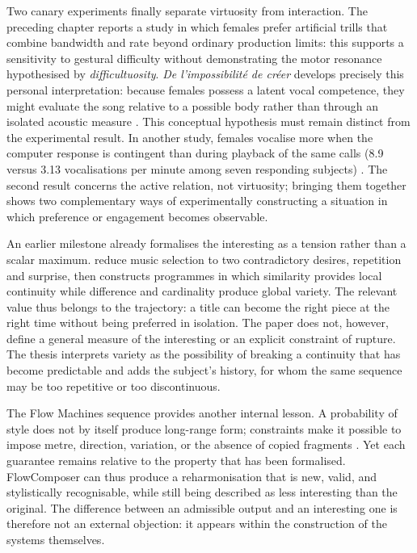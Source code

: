 \documentclass[11pt,a4paper]{article}
\begin{document}
Two canary experiments finally separate virtuosity from interaction. The
preceding chapter reports a study in which females prefer artificial trills that
combine bandwidth and rate beyond ordinary production limits: this supports a
sensitivity to gestural difficulty without demonstrating the motor resonance
hypothesised by \emph{difficultuosity}. \emph{De l'impossibilité de créer}
develops precisely this personal interpretation: because females possess a latent
vocal competence, they might evaluate the song relative to a possible body rather
than through an isolated acoustic measure \parencite{pachet2026impossibilite}.
This conceptual hypothesis must remain distinct from the experimental result. In
another study, females vocalise more
when the computer response is contingent than during playback of the same calls
(8.9 versus 3.13 vocalisations per minute among seven responding subjects)
\parencite{pachet2011hitsong,lerch2011closedloop}. The second result concerns the
active relation, not virtuosity; bringing them together shows two complementary
ways of experimentally constructing a situation in which preference or
engagement becomes observable.

An earlier milestone already formalises the interesting as a tension rather than a
scalar maximum. \textcite{pachet1999programs} reduce music selection to two
contradictory desires, repetition and surprise, then constructs programmes in which
similarity provides local continuity while difference and cardinality produce global
variety. The relevant value thus belongs to the trajectory: a title can become the
right piece at the right time without being preferred in isolation. The paper does not,
however, define a general measure of the interesting or an explicit constraint of
rupture. The thesis interprets variety as the possibility of breaking a continuity
that has become predictable and adds the subject's history, for whom the same sequence
may be too repetitive or too discontinuous.

The Flow Machines sequence provides another internal lesson. A probability of style
does not by itself produce long-range form; constraints make it possible to impose
metre, direction, variation, or the absence of copied fragments
\parencite{pachet2011markov,barbieri2012lyrics,papadopoulos2014avoiding,
papadopoulos2016nonplagiaristic,papadopoulos2016flowcomposer,
pachet2017variations}. Yet each guarantee remains relative to the property that has
been formalised. FlowComposer can thus produce a reharmonisation that is new, valid,
and stylistically recognisable, while still being described as less interesting than
the original. The difference between an admissible output and an interesting one is
therefore not an external objection: it appears within the construction of the systems
themselves.
\end{document}
